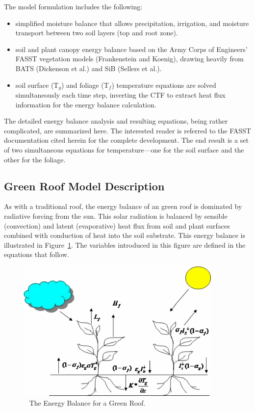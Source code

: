 The model formulation includes the following:

\begin{itemize}
\item
  simplified moisture balance that allows precipitation, irrigation, and moisture transport between two soil layers (top and root zone).
\item
  soil and plant canopy energy balance based on the Army Corps of Engineers' FASST vegetation models (Frankenstein and Koenig), drawing heavily from BATS (Dickenson et al.) and SiB (Sellers et al.).
\item
  soil surface (T\(_{g}\)) and foliage (T\(_{f}\)) temperature equations are solved simultaneously each time step, inverting the CTF to extract heat flux information for the energy balance calculation.
\end{itemize}

The detailed energy balance analysis and resulting equations, being rather complicated, are summarized here. The interested reader is referred to the FASST documentation cited herein for the complete development. The end result is a set of two simultaneous equations for temperature---one for the soil surface and the other for the foliage.

\subsection{Green Roof Model Description}\label{green-roof-model-description}

As with a traditional roof, the energy balance of an green roof is dominated by radiative forcing from the sun. This solar radiation is balanced by sensible (convection) and latent (evaporative) heat flux from soil and plant surfaces combined with conduction of heat into the soil substrate. This energy balance is illustrated in Figure~\ref{fig:the-energy-balance-for-a-green-roof.}. The variables introduced in this figure are defined in the equations that follow.

\begin{figure}[hbtp] %
\centering
\includegraphics[width=0.9\textwidth, height=0.9\textheight, keepaspectratio=true]{media/image509.png}
\caption{  The Energy Balance for a Green Roof. \protect \label{fig:the-energy-balance-for-a-green-roof.}}
\end{figure}

